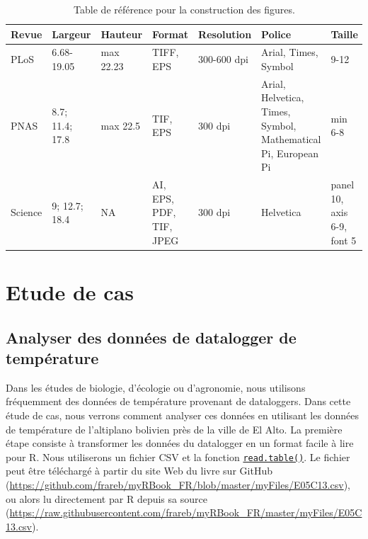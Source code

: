 \documentclass[]{book}
\begin{document}
\begin{table}[t]

\caption{\label{tab:tabRefPub}Table de référence pour la construction des figures.\label{tab:tabRefPub}}
\centering
\begin{tabular}{l|l|l|l|l|l|l}
\hline
Revue & Largeur & Hauteur & Format & Resolution & Police & Taille\\
\hline
PLoS & 6.68-19.05 & max 22.23 & TIFF, EPS & 300-600 dpi & Arial, Times, Symbol & 9-12\\
\hline
PNAS & 8.7; 11.4; 17.8 & max 22.5 & TIF, EPS & 300 dpi & Arial, Helvetica, Times, Symbol, Mathematical Pi, European Pi & min 6-8\\
\hline
Science & 9; 12.7; 18.4 & NA & AI, EPS, PDF, TIF, JPEG & 300 dpi & Helvetica & panel 10, axis 6-9, font 5\\
\hline
\end{tabular}
\end{table}

\hypertarget{part-etude-de-cas}{%
\part{Etude de cas}\label{part-etude-de-cas}}

\hypertarget{studyCase001}{%
\chapter{Analyser des données de datalogger de température}\label{studyCase001}}

Dans les études de biologie, d'écologie ou d'agronomie, nous utilisons fréquemment des données de température provenant de dataloggers. Dans cette étude de cas, nous verrons comment analyser ces données en utilisant les données de température de l'altiplano bolivien près de la ville de El Alto. La première étape consiste à transformer les données du datalogger en un format facile à lire pour R. Nous utiliserons un fichier CSV et la fonction \protect\hyperlink{import}{\texttt{read.table()}}. Le fichier peut être téléchargé à partir du site Web du livre sur GitHub (\url{https://github.com/frareb/myRBook_FR/blob/master/myFiles/E05C13.csv}), ou alors lu directement par R depuis sa source (\url{https://raw.githubusercontent.com/frareb/myRBook_FR/master/myFiles/E05C13.csv}).
\end{document}
